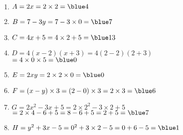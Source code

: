    \ \\ [-5mm]
   \begin{enumerate}
      \item $A =2x =2\times2 =\blue4$
      \item $B =7-3y =7-3\times0 =\blue7$
      \item $C =4x+5 =4\times2+5 =\blue13$
      \item $D =4(x-2)(x+3) =4(2-2)(2+3)$ \\
         \hspace*{7.5mm} $=4\times0\times5 =\blue0$
      \item $E =2xy =2\times2\times0 =\blue0$
      \item $F =(x-y)\times3 =(2-0)\times3 =2\times3 =\blue6$
      \item $G =2x^2-3x+5 =2\times2^2-3\times2+5$ \\
         \hspace*{7.3mm} $=2\times4-6+5 =8-6+5 =2+5 =\blue7$
      \item $H =y^2+3x-5 =0^2+3\times2-5 =0+6-5 =\blue1$
   \end{enumerate}
